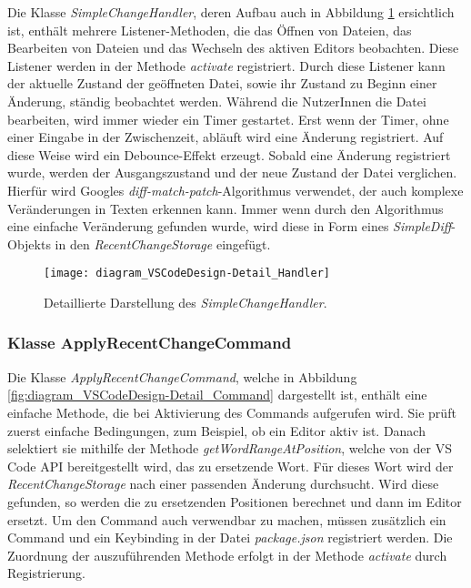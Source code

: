 Die Klasse \emph{SimpleChangeHandler}, 
deren Aufbau auch in Abbildung \ref{fig:diagram_VSCodeDesign-Detail_Handler} ersichtlich ist,
enthält mehrere Listener-Methoden,
die das Öffnen von Dateien, das Bearbeiten von Dateien und das
Wechseln des aktiven Editors beobachten. Diese Listener werden
in der Methode \emph{activate} registriert. Durch diese Listener
kann der aktuelle Zustand der geöffneten Datei, sowie ihr Zustand
zu Beginn einer Änderung, ständig beobachtet werden. Während
die NutzerInnen die Datei bearbeiten, wird immer wieder ein
Timer gestartet. Erst wenn der Timer, ohne einer Eingabe
in der Zwischenzeit, abläuft wird eine Änderung registriert. Auf diese 
Weise wird ein Debounce-Effekt erzeugt. Sobald eine Änderung
registriert wurde, werden der Ausgangszustand und der neue Zustand
der Datei verglichen. Hierfür wird Googles 
\emph{diff-match-patch}-Algorithmus \cite{DiffMatchPatchGithub}
verwendet, der auch komplexe Veränderungen in Texten erkennen kann. 
Immer wenn durch den Algorithmus eine einfache Veränderung gefunden
wurde, wird diese in Form eines \emph{SimpleDiff}-Objekts in
den \emph{RecentChangeStorage} eingefügt.

\begin{figure}
    \centering
    \texttt{[image: diagram\_VSCodeDesign-Detail\_Handler]}
    \caption{Detaillierte Darstellung des \emph{SimpleChangeHandler}.}
    \label{fig:diagram_VSCodeDesign-Detail_Handler}
\end{figure}

\subsubsection{Klasse ApplyRecentChangeCommand}

Die Klasse \emph{ApplyRecentChangeCommand}, 
welche in Abbildung \ref{fig:diagram_VSCodeDesign-Detail_Command} dargestellt ist,
enthält eine einfache Methode,
die bei Aktivierung des Commands aufgerufen wird. Sie prüft zuerst
einfache Bedingungen, zum Beispiel, ob ein Editor aktiv ist.
Danach selektiert sie mithilfe der Methode \emph{getWordRangeAtPosition},
welche von der VS Code API bereitgestellt wird, das zu ersetzende Wort.
Für dieses Wort wird der \emph{RecentChangeStorage} nach einer passenden
Änderung durchsucht. Wird diese gefunden, so werden die zu ersetzenden
Positionen berechnet und dann im Editor ersetzt. Um den Command auch 
verwendbar zu machen, müssen zusätzlich ein Command und ein Keybinding
in der Datei \emph{package.json} registriert werden. Die Zuordnung
der auszuführenden Methode erfolgt in der Methode \emph{activate}
durch Registrierung.

